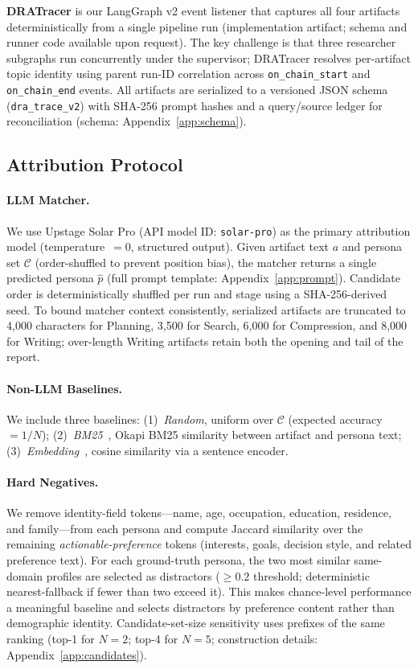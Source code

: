 \documentclass[]{article}
\begin{document}
\textbf{DRATracer} is our LangGraph v2 event listener that captures all four
artifacts deterministically from a single pipeline run (implementation
artifact; schema and runner code available upon request).
The key challenge is that three researcher subgraphs run concurrently under
the supervisor; DRATracer resolves per-artifact topic identity using parent
run-ID correlation across \texttt{on\_chain\_start} and \texttt{on\_chain\_end}
events.
All artifacts are serialized to a versioned JSON schema (\texttt{dra\_trace\_v2})
with SHA-256 prompt hashes and a query/source ledger for reconciliation
(schema: Appendix~\ref{app:schema}).

\subsection{Attribution Protocol}

\paragraph{LLM Matcher.}
We use Upstage Solar Pro (API model ID: \texttt{solar-pro}) as the primary attribution model (temperature~$=0$, structured output).
Given artifact text $a$ and persona set $\mathcal{C}$ (order-shuffled to prevent position bias), the matcher returns a single predicted persona $\hat{p}$ (full prompt template: Appendix~\ref{app:prompt}).
Candidate order is deterministically shuffled per run and stage using a SHA-256-derived seed.
To bound matcher context consistently, serialized artifacts are truncated to
4,000 characters for Planning, 3,500 for Search, 6,000 for Compression, and
8,000 for Writing; over-length Writing artifacts retain both the opening and
tail of the report.

\paragraph{Non-LLM Baselines.}
We include three baselines: (1)~\emph{Random}, uniform over $\mathcal{C}$
(expected accuracy~$= 1/N$); (2)~\emph{BM25}~\cite{robertson2009bm25}, Okapi
BM25 similarity between artifact and persona text;
(3)~\emph{Embedding}~\cite{reimers2019sentence}, cosine similarity via a
sentence encoder.

\paragraph{Hard Negatives.}
We remove identity-field tokens---name, age, occupation, education, residence,
and family---from each persona and compute Jaccard similarity over the remaining
\emph{actionable-preference} tokens (interests, goals, decision style, and related
preference text).
For each ground-truth persona, the two most similar same-domain profiles are
selected as distractors ($\geq 0.2$ threshold; deterministic nearest-fallback if
fewer than two exceed it).
This makes chance-level performance a meaningful baseline and selects distractors
by preference content rather than demographic identity.
Candidate-set-size sensitivity uses prefixes of the same ranking
(top-1 for $N=2$; top-4 for $N=5$; construction details: Appendix~\ref{app:candidates}).
\end{document}
